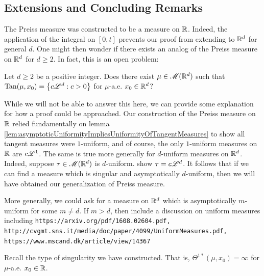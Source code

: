 \subsection{Extensions and Concluding Remarks}
The Preiss measure was constructed to be a measure on $\mathbb{R}$. Indeed, the application of the integral on $[0,t]$ prevents our proof from extending to $\mathbb{R}^d$ for general $d$. One might then wonder if there exists an analog of the Preiss measure on $\mathbb{R}^d$ for $d \geq 2$. In fact, this is an open problem:
\begin{question}
    Let $d \geq 2$ be a positive integer. Does there exist $\mu \in \mathscr{M}(\mathbb{R}^d)$ such that $\operatorname{Tan}(\mu,x_0) = \left\{ {c\mathscr{L}^d : c > 0} \right\}$ for $\mu$-a.e. $x_0 \in \mathbb{R}^d$?
\end{question}
While we will not be able to answer this here, we can provide some explanation for how a proof could be approached. Our construction of the Preiss measure on $\mathbb{R}$ relied fundamentally on lemma \ref{lem:asymptoticUniformityImpliesUniformityOfTangentMeasures} to show all tangent measures were $1$-uniform, and of course, the only $1$-uniform measures on $\mathbb{R}$ are $c\mathscr{L}^1$. The same is true more generally for $d$-uniform measures on $\mathbb{R}^d$. Indeed, suppose $\tau \in \mathscr{M}(\mathbb{R}^d)$ is $d$-uniform. {\color{red} show $\tau = c\mathscr{L}^d$.} It follows that if we can find a measure which is singular and asymptotically $d$-uniform, then we will have obtained our generalization of Preiss measure.

More generally, we could ask for a measure on $\mathbb{R}^d$ which is asymptotically $m$-uniform for some $m \neq d$. If $m > d$, then {\color{red} include a discussion on uniform measures including \texttt{https://arxiv.org/pdf/1608.02604.pdf, http://cvgmt.sns.it/media/doc/paper/4099/UniformMeasures.pdf, https://www.mscand.dk/article/view/14367}}

Recall the type of singularity we have constructed. That is, $\Theta^{1*}(\mu,x_0) = \infty$ for $\mu$-a.e. $x_0 \in \mathbb{R}$.

